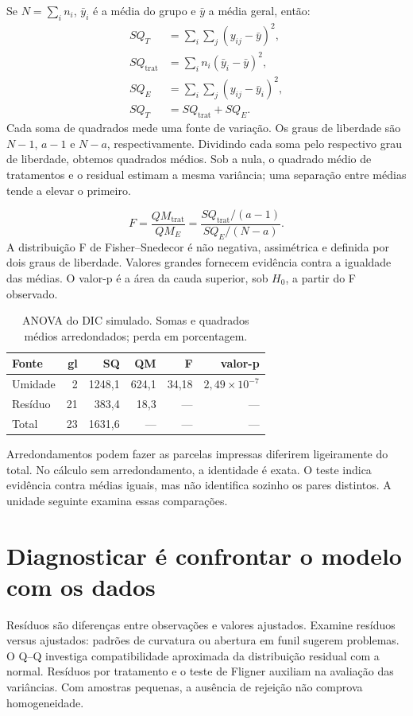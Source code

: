 Se $N=\sum_i n_i$, $\bar y_i$ é a média do grupo e $\bar y$ a média geral, então:
\begin{align}
SQ_T&=\sum_i\sum_j(y_{ij}-\bar y)^2,\\
SQ_{\mathrm{trat}}&=\sum_i n_i(\bar y_i-\bar y)^2,\\
SQ_E&=\sum_i\sum_j(y_{ij}-\bar y_i)^2,\\
SQ_T&=SQ_{\mathrm{trat}}+SQ_E.
\end{align}
Cada soma de quadrados mede uma fonte de variação. Os graus de liberdade são $N-1$, $a-1$ e $N-a$, respectivamente. Dividindo cada soma pelo respectivo grau de liberdade, obtemos quadrados médios. Sob a nula, o quadrado médio de tratamentos e o residual estimam a mesma variância; uma separação entre médias tende a elevar o primeiro.

\begin{equation}F=\frac{QM_{\mathrm{trat}}}{QM_E}
=\frac{SQ_{\mathrm{trat}}/(a-1)}{SQ_E/(N-a)}.\end{equation}
A distribuição F de Fisher--Snedecor é não negativa, assimétrica e definida por dois graus de liberdade. Valores grandes fornecem evidência contra a igualdade das médias. O valor-p é a área da cauda superior, sob $H_0$, a partir do F observado.

\begin{table}[H]\centering\small
\caption{ANOVA do DIC simulado. Somas e quadrados médios arredondados; perda em porcentagem.}
\begin{tabular}{lrrrrr}\toprule
Fonte & gl & SQ & QM & F & valor-p\\\midrule
Umidade & 2 & 1248,1 & 624,1 & 34,18 & $2{,}49\times10^{-7}$\\
Resíduo & 21 & 383,4 & 18,3 & --- & ---\\
Total & 23 & 1631,6 & --- & --- & ---\\\bottomrule
\end{tabular}\end{table}

Arredondamentos podem fazer as parcelas impressas diferirem ligeiramente do total. No cálculo sem arredondamento, a identidade é exata. O teste indica evidência contra médias iguais, mas não identifica sozinho os pares distintos. A unidade seguinte examina essas comparações.

\section{Diagnosticar é confrontar o modelo com os dados}
Resíduos são diferenças entre observações e valores ajustados. Examine resíduos versus ajustados: padrões de curvatura ou abertura em funil sugerem problemas. O Q--Q investiga compatibilidade aproximada da distribuição residual com a normal. Resíduos por tratamento e o teste de Fligner auxiliam na avaliação das variâncias. Com amostras pequenas, a ausência de rejeição não comprova homogeneidade.

